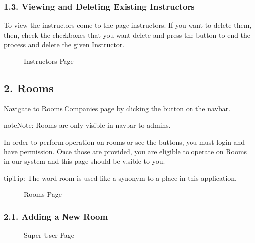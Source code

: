 \documentclass[letterpaper,10pt,english]{sphinxmanual}
\begin{document}
\subsubsection{1.3. Viewing and Deleting Existing Instructors}
\label{\detokenize{user/berkay:viewing-and-deleting-existing-instructors}}
To view the instructors come to the page instructors. If you want to delete them,
then, check the checkboxes that you want delete and press the  button to
end the process and delete the given Instructor.

\begin{figure}[htbp]
\centering
\capstart

\noindent{}
\caption{Instructors Page}\label{\detokenize{user/berkay:id3}}\end{figure}


\subsection{2. Rooms}
\label{\detokenize{user/berkay:rooms}}
Navigate to Rooms Companies page by clicking the  button on the navbar.

\begin{sphinxadmonition}{note}{Note:}
Rooms are only visible in navbar to admins.
\end{sphinxadmonition}

In order to perform operation on rooms or see the buttons, you must login and have permission.
Once those are provided, you are eligible to operate on Rooms in our system and this page should be
visible to you.

\begin{sphinxadmonition}{tip}{Tip:}
The word room is used like a synonym to a place in this application.
\end{sphinxadmonition}

\begin{figure}[htbp]
\centering
\capstart

\noindent{}
\caption{Rooms Page}\label{\detokenize{user/berkay:id4}}\end{figure}


\subsubsection{2.1. Adding a New Room}
\label{\detokenize{user/berkay:adding-a-new-room}}
\begin{figure}[htbp]
\centering
\capstart

\noindent{}
\caption{Super User Page}\label{\detokenize{user/berkay:id5}}\end{figure}
\end{document}
